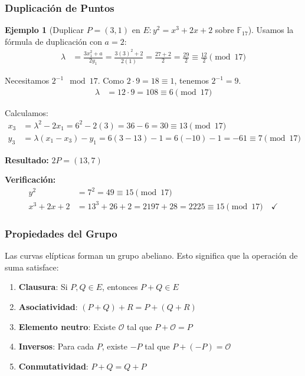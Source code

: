 \documentclass[11pt,a4paper,twoside,openright]{book}
\theoremstyle{definition}
\newtheorem{example}{Ejemplo}[chapter]
\theoremstyle{plain}
\theoremstyle{remark}
\begin{document}
\subsubsection{Duplicación de Puntos}

\begin{example}[Duplicar $P = (3, 1)$ en $E: y^2 = x^3 + 2x + 2$ sobre $\mathbb{F}_{17}$]

Usamos la fórmula de duplicación con $a = 2$:
\begin{align}
\lambda &= \frac{3x_1^2 + a}{2y_1} = \frac{3(3)^2 + 2}{2(1)} = \frac{27 + 2}{2} = \frac{29}{2} \equiv \frac{12}{2} \pmod{17}
\end{align}

Necesitamos $2^{-1} \mod 17$. Como $2 \cdot 9 = 18 \equiv 1$, tenemos $2^{-1} = 9$.
\begin{align}
\lambda &= 12 \cdot 9 = 108 \equiv 6 \pmod{17}
\end{align}

Calculamos:
\begin{align}
x_3 &= \lambda^2 - 2x_1 = 6^2 - 2(3) = 36 - 6 = 30 \equiv 13 \pmod{17} \\
y_3 &= \lambda(x_1 - x_3) - y_1 = 6(3 - 13) - 1 = 6(-10) - 1 = -61 \equiv 7 \pmod{17}
\end{align}

\textbf{Resultado:} $2P = (13, 7)$

\textbf{Verificación:}
\begin{align}
y^2 &= 7^2 = 49 \equiv 15 \pmod{17} \\
x^3 + 2x + 2 &= 13^3 + 26 + 2 = 2197 + 28 = 2225 \equiv 15 \pmod{17} \quad \checkmark
\end{align}
\end{example}

\subsubsection{Propiedades del Grupo}

\begin{keyidea}
Las curvas elípticas forman un grupo abeliano. Esto significa que la operación de suma satisface:
\begin{enumerate}
    \item \textbf{Clausura}: Si $P, Q \in E$, entonces $P + Q \in E$
    \item \textbf{Asociatividad}: $(P + Q) + R = P + (Q + R)$
    \item \textbf{Elemento neutro}: Existe $\mathcal{O}$ tal que $P + \mathcal{O} = P$
    \item \textbf{Inversos}: Para cada $P$, existe $-P$ tal que $P + (-P) = \mathcal{O}$
    \item \textbf{Conmutatividad}: $P + Q = Q + P$
\end{enumerate}
\end{keyidea}
\end{document}
